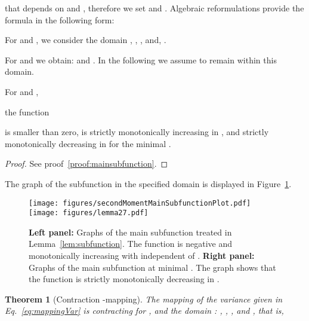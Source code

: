 \documentclass{article}
\newtheorem{theorem}{Theorem}
\begin{document}
that depends on  and , therefore we 
set   and . Algebraic reformulations provide the 
formula in the following form:



For  and 
,
we consider the domain
, 
,
, and,
.

For  and  we obtain:  and 
.
In the following we assume to remain within this domain.

\begin{lemma}
\label{lem:subfunction}

For  and , 

the function

is smaller than zero, is strictly monotonically increasing in ,
and strictly monotonically decreasing in  for the minimal .
\end{lemma}

\begin{proof}
See proof~\ref{proof:mainsubfunction}.
\end{proof}

The graph of the subfunction in the specified domain is displayed in Figure~\ref{fig:subfunction}.

\begin{figure}
 \centering
 \texttt{[image: figures/secondMomentMainSubfunctionPlot.pdf]}
 \texttt{[image: figures/lemma27.pdf]}
 \caption[Graph of the main subfunction of the derivative of the second moment]{{\bf Left panel:} Graphs of the main subfunction 
  treated in Lemma~\ref{lem:subfunction}. The function is negative and monotonically increasing with  independent of . 
   {\bf Right panel:}  Graphs of the main subfunction at minimal . The graph shows that the function  is strictly monotonically decreasing in .
  \label{fig:subfunction}}
\end{figure}







\begin{theorem}[Contraction -mapping]
\label{th:s2Cont}
The mapping of the variance   given in Eq.~\eqref{eq:mappingVar}
is contracting for 
, 
and the domain : 
, 
,
, and 
, that is,

\end{theorem}
\end{document}
